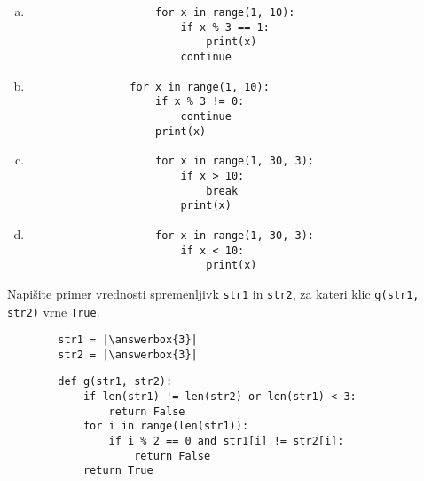 \documentclass[arhiv, 10pt]{../izpit}
\newcommand{\inlinepy}[1]{\texttt{#1}}
\newcommand{\answerbox}[1]{\framebox{\vphantom{\large M}\hspace{#1cm}}}
\begin{document}
        \begin{multicols}{2}
        \begin{enumerate}[(a)]
\item 
                \begin{verbatim}
                    for x in range(1, 10):
                        if x % 3 == 1:
                            print(x)
                        continue
                \end{verbatim}
            
\item 
            \begin{verbatim}
                for x in range(1, 10):
                    if x % 3 != 0:
                        continue
                    print(x)
            \end{verbatim}
        
\item 
                \begin{verbatim}
                    for x in range(1, 30, 3):
                        if x > 10:
                            break
                        print(x)
                \end{verbatim}
            
\item 
                \begin{verbatim}
                    for x in range(1, 30, 3):
                        if x < 10:
                            print(x)
                \end{verbatim}
            
\end{enumerate}

        \end{multicols}
    
        \naloga*
        \begin{multicols}{2}
        \noindent
        Napišite primer vrednosti spremenljivk \inlinepy{str1} in \inlinepy{str2}, za kateri klic \inlinepy{g(str1, str2)} vrne \inlinepy{True}.
        \begin{verbatim}
        str1 = |\answerbox{3}|
        str2 = |\answerbox{3}|
        \end{verbatim}
        \vfil
        \columnbreak
        \begin{verbatim}
        def g(str1, str2):
            if len(str1) != len(str2) or len(str1) < 3:
                return False
            for i in range(len(str1)):
                if i % 2 == 0 and str1[i] != str2[i]:
                    return False
            return True
        \end{verbatim}
        \end{multicols}
    
\end{document}
